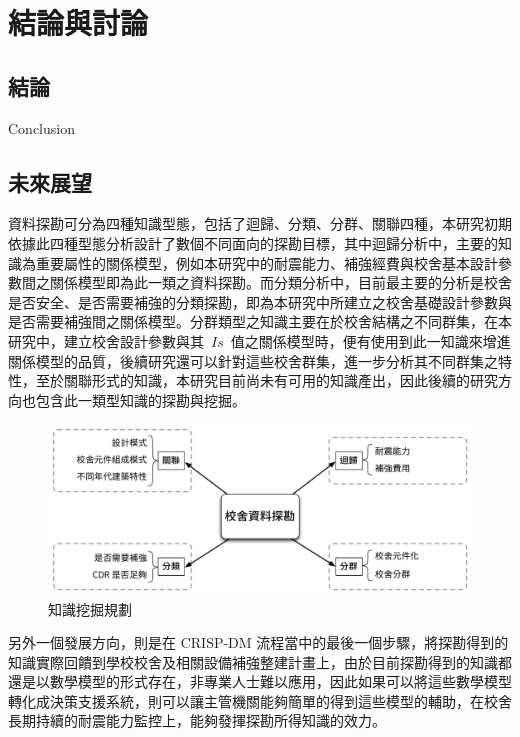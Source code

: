 \renewcommand\thetable{\arabic{chapter}-\arabic{table}}
\chapter{結論與討論}
\label{cha:conclusions}


\section{結論}

Conclusion


\section{未來展望} 



資料探勘可分為四種知識型態，包括了迴歸、分類、分群、關聯四種，本研究初期依據此四種型態分析設計了數個不同面向的探勘目標，其中迴歸分析中，主要的知識為重要屬性的關係模型，例如本研究中的耐震能力、補強經費與校舍基本設計參數間之關係模型即為此一類之資料探勘。而分類分析中，目前最主要的分析是校舍是否安全、是否需要補強的分類探勘，即為本研究中所建立之校舍基礎設計參數與是否需要補強間之關係模型。分群類型之知識主要在於校舍結構之不同群集，在本研究中，建立校舍設計參數與其~$Is$~值之關係模型時，便有使用到此一知識來增進關係模型的品質，後續研究還可以針對這些校舍群集，進一步分析其不同群集之特性，至於關聯形式的知識，本研究目前尚未有可用的知識產出，因此後續的研究方向也包含此一類型知識的探勘與挖掘。

\begin{figure}[hbtp]
  \begin{center}
    \includegraphics[width=1.0\textwidth]{figures/big-picture.pdf}
    \caption{知識挖掘規劃} 
    \label{fig:bigpicture}
  \end{center}
\end{figure}

另外一個發展方向，則是在 CRISP-DM 流程當中的最後一個步驟，將探勘得到的知識實際回饋到學校校舍及相關設備補強整建計畫上，由於目前探勘得到的知識都還是以數學模型的形式存在，非專業人士難以應用，因此如果可以將這些數學模型轉化成決策支援系統，則可以讓主管機關能夠簡單的得到這些模型的輔助，在校舍長期持續的耐震能力監控上，能夠發揮探勘所得知識的效力。


